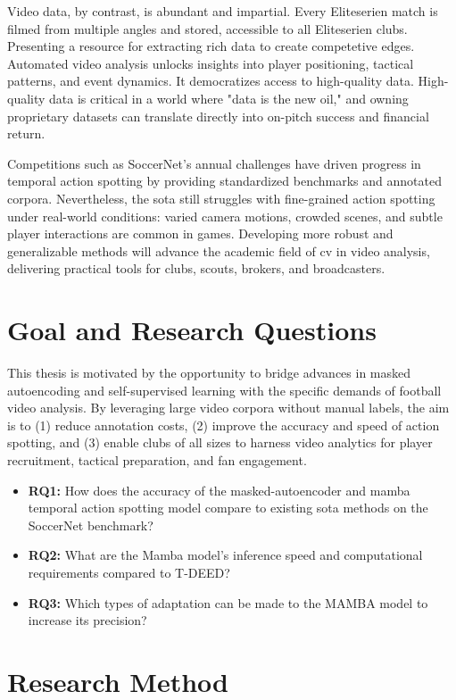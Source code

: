 Video data, by contrast, is abundant and impartial. Every Eliteserien match is filmed from multiple angles and stored, accessible to all Eliteserien clubs. Presenting a resource for extracting rich data to create competetive edges. Automated video analysis unlocks insights into player positioning, tactical patterns, and event dynamics. It democratizes access to high-quality data. High-quality data is critical in a world where "data is the new oil," and owning proprietary datasets can translate directly into on-pitch success and financial return.  

Competitions such as SoccerNet's annual challenges have driven progress in temporal action spotting by providing standardized benchmarks and annotated corpora. Nevertheless, the \acrlong{sota} still struggles with fine-grained action spotting under real-world conditions: varied camera motions, crowded scenes, and subtle player interactions are common in games. Developing more robust and generalizable methods will advance the academic field of \acrshort{cv} in video analysis, delivering practical tools for clubs, scouts, brokers, and broadcasters.  


\section{Goal and Research Questions}
This thesis is motivated by the opportunity to bridge advances in masked autoencoding and self-supervised learning with the specific demands of football video analysis. By leveraging large video corpora without manual labels, the aim is to (1) reduce annotation costs, (2) improve the accuracy and speed of action spotting, and (3) enable clubs of all sizes to harness video analytics for player recruitment, tactical preparation, and fan engagement.  
\label{sec:research_questions}
\begin{itemize}
    \item \textbf{RQ1:} How does the accuracy of the masked-autoencoder and mamba temporal action spotting model compare to existing \acrlong{sota} methods on the SoccerNet benchmark?
    \item \textbf{RQ2:} What are the Mamba model's inference speed and computational requirements compared to T-DEED?
    \item \textbf{RQ3:} Which types of adaptation can be made to the MAMBA model to increase its precision?
\end{itemize}

\section{Research Method}

